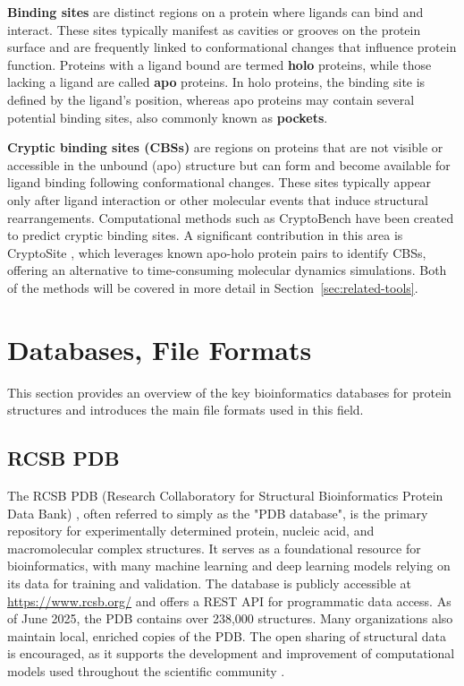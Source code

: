 \textbf{Binding sites} are distinct regions on a protein where ligands can bind and interact. These sites typically manifest as cavities or grooves on the protein surface and are frequently linked to conformational changes that influence protein function. Proteins with a ligand bound are termed \textbf{holo} proteins, while those lacking a ligand are called \textbf{apo} proteins. In holo proteins, the binding site is defined by the ligand’s position, whereas apo proteins may contain several potential binding sites, also commonly known as \textbf{pockets}.

\textbf{Cryptic binding sites (CBSs)} are regions on proteins that are not visible or accessible in the unbound (apo) structure but can form and become available for ligand binding following conformational changes. These sites typically appear only after ligand interaction or other molecular events that induce structural rearrangements. Computational methods such as CryptoBench \cite{vskrhak2025cryptobench} have been created to predict cryptic binding sites. A significant contribution in this area is CryptoSite \cite{cimermancic2016cryptosite}, which leverages known apo-holo protein pairs to identify CBSs, offering an alternative to time-consuming molecular dynamics simulations. Both of the methods will be covered in more detail in Section~\ref{sec:related-tools}.

\section{Databases, File Formats}
\label{sec:dbs-formats}

This section provides an overview of the key bioinformatics databases for protein structures and introduces the main file formats used in this field.

\subsection{RCSB PDB}
\label{sec:rcsb-pdb}

The RCSB PDB (Research Collaboratory for Structural Bioinformatics Protein Data Bank) \cite{berman2000protein}, often referred to simply as the "PDB database", is the primary repository for experimentally determined protein, nucleic acid, and macromolecular complex structures. It serves as a foundational resource for bioinformatics, with many machine learning and deep learning models relying on its data for training and validation. The database is publicly accessible at \url{https://www.rcsb.org/} and offers a REST API for programmatic data access. As of June 2025, the PDB contains over 238,000 structures. Many organizations also maintain local, enriched copies of the PDB. The open sharing of structural data is encouraged, as it supports the development and improvement of computational models used throughout the scientific community \cite{callaway2025alphafold}.


